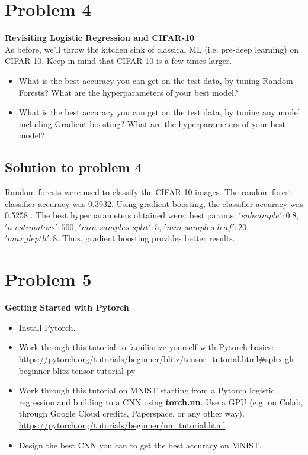\documentclass[12pt]{article}%
\begin{document}

\section{Problem 4}

\textbf{Revisiting Logistic Regression and CIFAR-10}\\

As before, we'll throw the kitchen sink of classical ML (i.e. pre-deep learning) on CIFAR-10. Keep in mind that CIFAR-10 is a few times larger.

\begin{itemize}
    \item What is the best accuracy you can get on the test data, by tuning Random Forests? What are the hyperparameters of your best model?
    \item What is the best accuracy you can get on the test data, by tuning any model including Gradient boosting? What are the hyperparameters of your best model?
\end{itemize}

\subsection{Solution to problem 4}

Random forests were used to classify the CIFAR-10 images. The random forest classifier accuracy was 0.3932. Using gradient boosting, the classifier accuracy was 0.5258 . The best hyperparameters obtained were: best params:  {$'subsample': 0.8$, $'n\_estimators': 500$, $'min\_samples\_split': 5$, $'min\_samples\_leaf': 20$, $'max\_depth': 8$}. Thus, gradient boosting provides better results.\\




\section{Problem 5}

\textbf{Getting Started with Pytorch}\\

\begin{itemize}
    \item Install Pytorch.
    \item Work through this tutorial to familiarize yourself with Pytorch basics: \url{https://pytorch.org/tutorials/beginner/blitz/tensor_tutorial.html#sphx-glr-beginner-blitz-tensor-tutorial-py}
    \item Work through this tutorial on MNIST starting from a Pytorch logistic regression and building to a CNN using \textbf{torch.nn}. Use a GPU (e.g. on Colab, through Google Cloud credits, Paperspace, or any other way). \url{https://pytorch.org/tutorials/beginner/nn_tutorial.html}
    \item Design the best CNN you can to get the best accuracy on MNIST.
\end{itemize}
\end{document}
